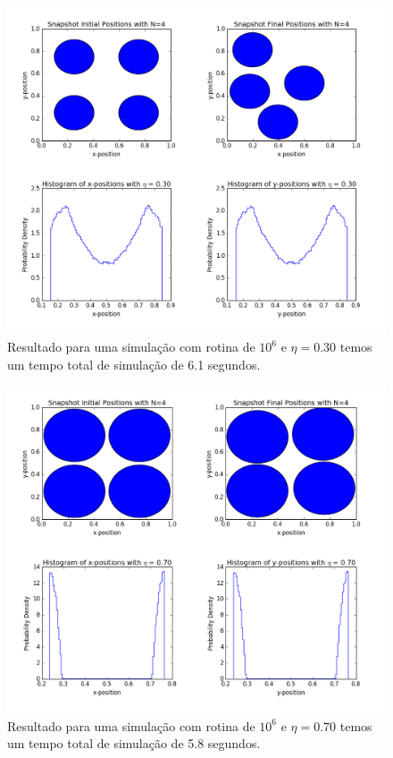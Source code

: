 \documentclass[%
reprint,
amsmath,amssymb,
aps,
12pt
]{revtex4-1}
\begin{document}
\begin{figure}[!h]
	\centering
	\includegraphics[scale=0.25]{mcm3.png}
	\caption{Resultado para uma simulação com rotina de $ 10^6 $ e $ \eta = 0.30 $ temos um tempo total de simulação de 6.1 segundos.
		\label{mcm3}}
\end{figure}
\begin{figure}[!h]
	\centering
	\includegraphics[scale=0.26]{mcm4.png}
	\caption{Resultado para uma simulação com rotina de $ 10^6 $ e $ \eta = 0.70 $ temos um tempo total de simulação de 5.8 segundos.
		\label{mcm4}}
\end{figure}
\end{document}
